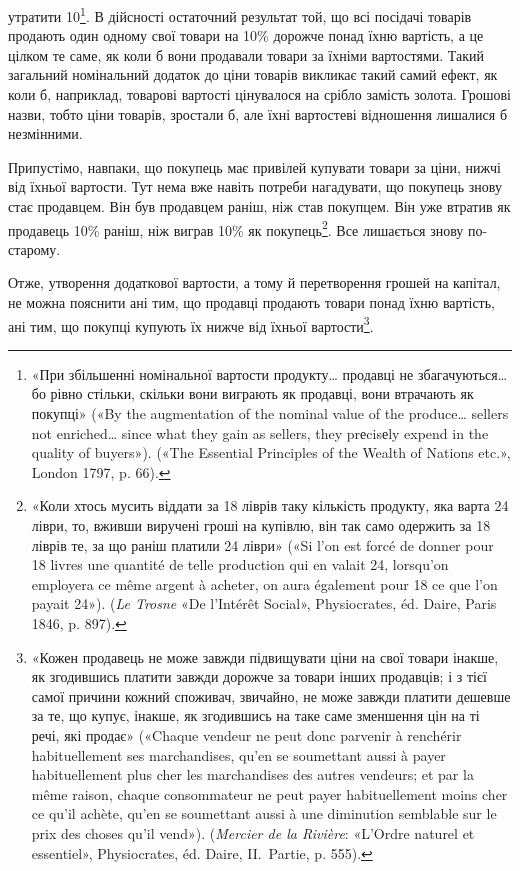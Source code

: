 \parcont{}  %
утратити 10\footnote{
«При збільшенні номінальної вартости продукту\dots{} продавці не
збагачуються\dots{} бо рівно стільки, скільки вони виграють як продавці,
вони втрачають як покупці» («By the augmentation of the nominal value
of the produce\dots{} sellers not enriched\dots{} since what they gain as sellers, they
prеcisеly expend in the quality of buyers»). («The Essential Principles of
the Wealth of Nations etc.», London 1797, p. 66).
}. В дійсності остаточний результат той, що всі посідачі
товарів продають один одному свої товари на 10\% дорожче
понад їхню вартість, а це цілком те саме, як коли б вони продавали
товари за їхніми вартостями. Такий загальний номінальний
додаток до ціни товарів викликає такий самий ефект, як коли б,
наприклад, товарові вартості цінувалося на срібло замість золота.
Грошові назви, тобто ціни товарів, зростали б, але їхні
вартостеві відношення лишалися б незмінними.

Припустімо, навпаки, що покупець має привілей купувати
товари за ціни, нижчі від їхньої вартости. Тут нема вже навіть
потреби нагадувати, що покупець знову стає продавцем. Він
був продавцем раніш, ніж став покупцем. Він уже втратив як
продавець 10\% раніш, ніж виграв 10\% як покупець\footnote{
«Коли хтось мусить віддати за 18 ліврів таку кількість продукту,
яка варта 24 ліври, то, вживши виручені гроші на купівлю, він так само
одержить за 18 ліврів те, за що раніш платили 24 ліври» («Si l’on est
forcé de donner pour 18 livres une quantité de telle production qui en valait
24, lorsqu’on employera ce même argent à acheter, on aura également pour
18 ce que l’on payait 24»). (\emph{Le Trosne} «De l’Intérêt Social»,
Physiocrates, éd. Daire, Paris 1846, p. 897).
}. Все лишається знову по-старому.

Отже, утворення додаткової вартости, а тому й перетворення
грошей на капітал, не можна пояснити ані тим, що продавці
продають товари понад їхню вартість, ані тим, що покупці купують
їх нижче від їхньої вартости\footnote{
«Кожен продавець не може завжди підвищувати ціни на свої товари
інакше, як згодившись платити завжди дорожче за товари інших продавців;
і з тієї самої причини кожний споживач, звичайно, не може завжди
платити дешевше за те, що купує, інакше, як згодившись на таке саме зменшення
цін на ті речі, які продає» («Chaque vendeur ne peut donc parvenir
à renchérir habituellement ses marchandises, qu’en se soumettant aussi à
payer habituellement plus cher les marchandises des autres vendeurs; et
par la même raison, chaque consommateur ne peut payer habituellement
moins cher ce qu’il achète, qu’en se soumettant aussi à une diminution
semblable sur le prix des choses qu’il vend»). (\emph{Mercier de la Rivière}:
«L’Ordre naturel et essentiel», Physiocrates, éd. Daire, II.~Partie, p. 555).
}.

